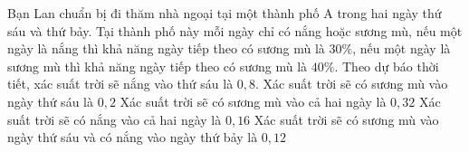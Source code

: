 \begin{ex}%
	Bạn Lan chuẩn bị đi thăm nhà ngoại tại một thành phố A trong hai ngày thứ sáu và thứ bảy. Tại thành phố này mỗi ngày chỉ có nắng hoặc sương mù, nếu một ngày là nắng thì khả năng ngày tiếp theo có sương mù là $30\%$, nếu một ngày là sương mù thì khả năng ngày tiếp theo  có sương mù là $40\%$. Theo dự báo thời tiết, xác suất trời sẽ nắng vào thứ sáu là $0{,}8$.
	\choiceTF 
		 {\True Xác suất trời sẽ có sương mù vào ngày thứ sáu là $0{,}2$}
		{Xác  suất trời sẽ có sương mù vào cả hai ngày là $0{,}32$}
		{Xác suất trời sẽ có nắng vào cả hai  ngày là $0{,}16$}
		{\True Xác suất trời sẽ có sương mù  vào ngày thứ sáu và có nắng vào ngày thứ bảy là $0{,}12$}
\end{ex}

